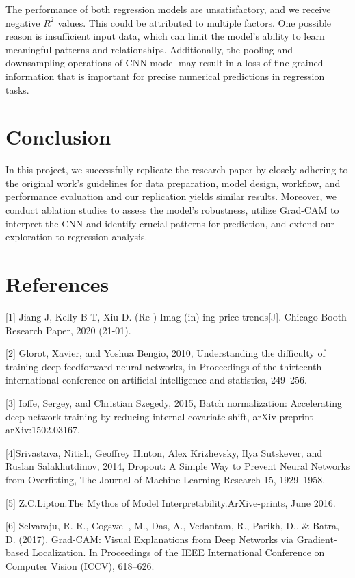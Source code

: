 \documentclass{article}
\begin{document}
The  performance of both regression models are unsatisfactory, and we receive negative $R^{2}$ values. This could be attributed to multiple factors. One possible reason is insufficient input data, which can limit the model's ability to learn meaningful patterns and relationships. Additionally, the pooling and downsampling operations of CNN model may result in a loss of fine-grained information that is important for precise numerical predictions in regression tasks.

\section{Conclusion}

In this project, we successfully replicate the research paper by closely adhering to the original work's guidelines for data preparation, model design, workflow, and performance evaluation and our replication yields similar results. Moreover, we conduct ablation studies to assess the model's robustness, utilize Grad-CAM to interpret the CNN and identify crucial patterns for prediction, and extend our exploration to regression analysis. 

\section*{References}

\medskip

\small


[1] Jiang J, Kelly B T, Xiu D. (Re-) Imag (in) ing price trends[J]. Chicago Booth Research Paper, 2020 (21-01).

[2] Glorot, Xavier, and Yoshua Bengio, 2010, Understanding the difficulty of training deep feedforward neural networks, in Proceedings of the thirteenth international conference on artificial intelligence and statistics, 249–256.

[3] Ioffe, Sergey, and Christian Szegedy, 2015, Batch normalization: Accelerating deep network training by reducing internal covariate shift, arXiv preprint arXiv:1502.03167. 

[4]Srivastava, Nitish, Geoffrey Hinton, Alex Krizhevsky, Ilya Sutskever, and Ruslan Salakhutdinov, 2014, Dropout: A Simple Way to Prevent Neural Networks from Overfitting, The Journal of Machine Learning Research 15, 1929–1958.

[5] Z.C.Lipton.The Mythos of Model Interpretability.ArXive-prints, June 2016.

[6] Selvaraju, R. R., Cogswell, M., Das, A., Vedantam, R., Parikh, D., \& Batra, D. (2017). Grad-CAM: Visual Explanations from Deep Networks via Gradient-based Localization. In Proceedings of the IEEE International Conference on Computer Vision (ICCV), 618–626.
\end{document}
